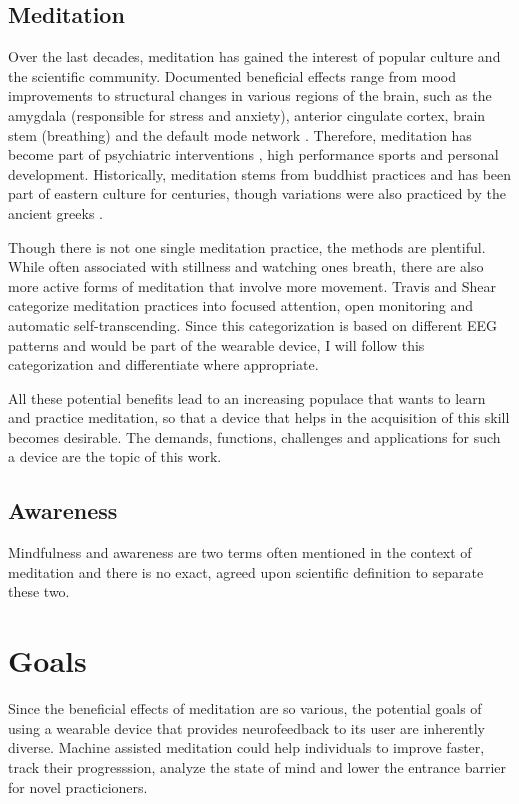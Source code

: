 \documentclass{llncs} %
\begin{document}
\subsection{Meditation}
Over the last decades, meditation has gained the interest of popular culture and the scientific community.
Documented beneficial effects range from mood improvements to structural changes \cite{Davidson} in various regions of the brain, such as the amygdala (responsible for stress and anxiety), anterior cingulate cortex, brain stem (breathing)
and the default mode network \cite{Tang:et al}.
Therefore, meditation has become part of psychiatric interventions \cite{Hoelzel}, high performance sports and personal development.
Historically, meditation stems from buddhist practices and has been part of eastern culture for centuries, though variations were also practiced by the ancient greeks \cite{Hadot:Davidson}.

Though there is not one single meditation practice, the methods are plentiful. While often associated with stillness and watching ones breath,
there are also more active forms of meditation that involve more movement. Travis and Shear categorize meditation practices into focused attention, open monitoring and automatic self-transcending.\cite{Travis} 
Since this categorization is based on different EEG patterns and would be part of the wearable device, I will follow this categorization and differentiate where appropriate.

All these potential benefits lead to an increasing populace that wants to learn and practice meditation, so that a device that helps in the acquisition of this skill becomes desirable. 
The demands, functions, challenges and applications for such a device are the topic of this work.
\subsection{Awareness}
Mindfulness and awareness are two terms often mentioned in the context of meditation and there is no exact, agreed upon scientific definition to separate these two.
\section{Goals}
Since the beneficial effects of meditation are so various, the potential goals of using a wearable device 
that provides neurofeedback to its user are inherently diverse. Machine assisted meditation could help individuals to 
improve faster, track their progresssion, analyze the state of mind and lower the entrance barrier for novel practicioners. \cite{brand:del} \
\end{document}
